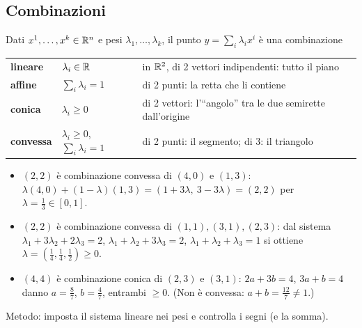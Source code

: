 \subsection{Combinazioni}
Dati $x^1,\dots,x^k\in\mathbb{R}^n$ e pesi $\lambda_1,\dots,\lambda_k$, il punto $y=\sum_i\lambda_ix^i$ è una combinazione
\begin{center}
\begin{tabular}{@{}lll@{}}
\toprule
\textbf{lineare} & $\lambda_i\in\mathbb{R}$ & in $\mathbb{R}^2$, di 2 vettori indipendenti: tutto il piano\\
\textbf{affine} & $\sum_i\lambda_i=1$ & di 2 punti: la retta che li contiene\\
\textbf{conica} & $\lambda_i\ge0$ & di 2 vettori: l'``angolo'' tra le due semirette dall'origine\\
\textbf{convessa} & $\lambda_i\ge0$, $\sum_i\lambda_i=1$ & di 2 punti: il segmento; di 3: il triangolo\\
\bottomrule
\end{tabular}
\end{center}

\begin{esbox}
\begin{itemize}[nosep]
\item $(2,2)$ è combinazione convessa di $(4,0)$ e $(1,3)$: $\lambda(4,0)+(1-\lambda)(1,3)=(1+3\lambda,\ 3-3\lambda)=(2,2)$ per $\lambda=\tfrac13\in[0,1]$.
\item $(2,2)$ è combinazione convessa di $(1,1),(3,1),(2,3)$: dal sistema $\lambda_1+3\lambda_2+2\lambda_3=2$, $\lambda_1+\lambda_2+3\lambda_3=2$, $\lambda_1+\lambda_2+\lambda_3=1$ si ottiene $\lambda=(\tfrac14,\tfrac14,\tfrac12)\ge0$.
\item $(4,4)$ è combinazione conica di $(2,3)$ e $(3,1)$: $2a+3b=4$, $3a+b=4$ danno $a=\tfrac87$, $b=\tfrac47$, entrambi $\ge0$. (Non è convessa: $a+b=\tfrac{12}{7}\ne1$.)
\end{itemize}
Metodo: imposta il sistema lineare nei pesi e controlla i segni (e la somma).
\end{esbox}

